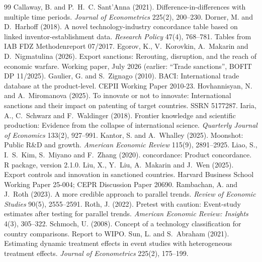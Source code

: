 \documentclass[11pt,a4paper]{article}
\begin{document}

\begin{thebibliography}{99}\small
{}
Callaway, B. and P.~H.~C. Sant'Anna (2021). Difference-in-differences with multiple time periods.
\emph{Journal of Econometrics} 225(2), 200--230.
Dorner, M. and D.~Harhoff (2018). A novel technology-industry concordance table based on linked
inventor-establishment data. \emph{Research Policy} 47(4), 768--781. Tables from IAB FDZ Methodenreport 07/2017.
Egorov, K., V.~Korovkin, A.~Makarin and D.~Nigmatulina (2026). Export sanctions: Rerouting, disruption, and the
reach of economic warfare. Working paper, July 2026 (earlier: ``Trade sanctions'', BOFIT DP 11/2025).
Gaulier, G. and S.~Zignago (2010). BACI: International trade database at the product-level. CEPII Working Paper
2010-23.
Hovhannisyan, N. and A.~Miromanova (2025). To innovate or not to innovate: International sanctions and their
impact on patenting of target countries. SSRN 5177287.
Iaria, A., C.~Schwarz and F.~Waldinger (2018). Frontier knowledge and scientific production: Evidence from the
collapse of international science. \emph{Quarterly Journal of Economics} 133(2), 927--991.
Kantor, S. and A.~Whalley (2025). Moonshot: Public R\&D and growth. \emph{American Economic Review} 115(9),
2891--2925.
Liao, S., I.~S.~Kim, S.~Miyano and F.~Zhang (2020). concordance: Product concordance. R package, version 2.1.0.
Liu, X., Y.~Liu, A.~Makarin and J.~Wen (2025). Export controls and innovation in sanctioned countries. Harvard
Business School Working Paper 25-004; CEPR Discussion Paper 20690.
Rambachan, A. and J.~Roth (2023). A more credible approach to parallel trends. \emph{Review of Economic Studies}
90(5), 2555--2591.
Roth, J. (2022). Pretest with caution: Event-study estimates after testing for parallel trends.
\emph{American Economic Review: Insights} 4(3), 305--322.
Schmoch, U. (2008). Concept of a technology classification for country comparisons. Report to WIPO.
Sun, L. and S.~Abraham (2021). Estimating dynamic treatment effects in event studies with heterogeneous treatment
effects. \emph{Journal of Econometrics} 225(2), 175--199.
\end{thebibliography}
\end{document}
